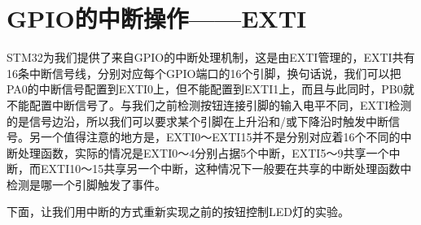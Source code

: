 \section{GPIO的中断操作——\acs{EXTI}}
STM32为我们提供了来自GPIO的中断处理机制，这是由EXTI管理的，EXTI共有16条中断信号线，分别对应每个GPIO端口的16个引脚，换句话说，我们可以把PA0的中断信号配置到EXTI0上，但不能配置到EXTI1上，而且与此同时，PB0就不能配置中断信号了。与我们之前检测按钮连接引脚的输入电平不同，EXTI检测的是信号边沿，所以我们可以要求某个引脚在上升沿和/或下降沿时触发中断信号。另一个值得注意的地方是，EXTI0～EXTI15并不是分别对应着16个不同的中断处理函数，实际的情况是EXTI0～4分别占据5个中断，EXTI5～9共享一个中断，而EXTI10～15共享另一个中断，这种情况下一般要在共享的中断处理函数中检测是哪一个引脚触发了事件。
\par 
下面，让我们用中断的方式重新实现之前的按钮控制LED灯的实验。

